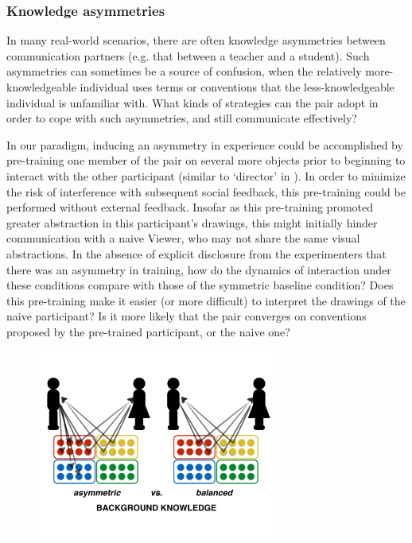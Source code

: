 \documentclass[12pt]{article}
\begin{document}
\subsubsection{Knowledge asymmetries} In many real-world scenarios, there are often knowledge asymmetries between communication partners (e.g. that between a teacher and a student). Such asymmetries can sometimes be a source of confusion, when the relatively more-knowledgeable individual uses terms or conventions that the less-knowledgeable individual is unfamiliar with. What kinds of strategies can the pair adopt in order to cope with such asymmetries, and still communicate effectively? 

In our paradigm, inducing an asymmetry in experience could be accomplished by pre-training one member of the pair on several more objects prior to beginning to interact with the other participant (similar to `director' in ). In order to minimize the risk of interference with subsequent social feedback, this pre-training could be performed without external feedback. Insofar as this pre-training promoted greater abstraction in this participant's drawings, this might initially hinder communication with a naive Viewer, who may not share the same visual abstractions. In the absence of explicit disclosure from the experimenters that there was an asymmetry in training, how do the dynamics of interaction under these conditions compare with those of the symmetric baseline condition? Does this pre-training make it easier (or more difficult) to interpret the drawings of the naive participant? Is it more likely that the pair converges on conventions proposed by the pre-trained participant, or the naive one? 

\begin{figure}[hbtp]
\begin{center}
\includegraphics[width=80mm]{figures/background_knowledge.pdf}
\end{center}
\end{figure}
\vspace{-5mm}
\end{document}
